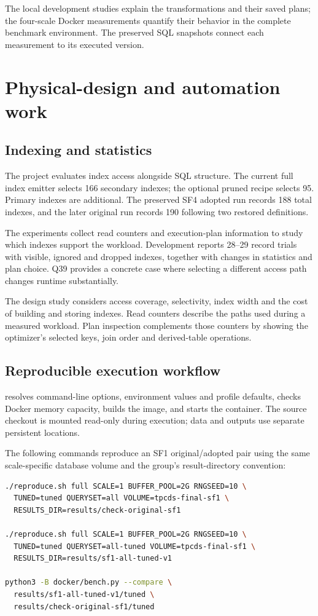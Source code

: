 \documentclass[11pt,a4paper]{article}
\DeclareRobustCommand{\file}[1]{\path{#1}}
\begin{document}
The local development studies explain the transformations and their saved
plans; the four-scale Docker measurements quantify their behavior in the
complete benchmark environment. The preserved SQL snapshots connect each
measurement to its executed version.

\section{Physical-design and automation work}
\subsection{Indexing and statistics}
The project evaluates index access alongside SQL structure. The current full
index emitter selects 166 secondary indexes; the optional pruned recipe
selects 95. Primary indexes are additional. The preserved SF4 adopted run
records 188 total indexes, and the later original run records 190 following
two restored definitions.

The experiments collect read counters and execution-plan information to study
which indexes support the workload. Development reports 28--29 record trials
with visible, ignored and dropped indexes, together with changes in statistics
and plan choice. Q39 provides a concrete case where selecting a different
access path changes runtime substantially.

The design study considers access coverage, selectivity, index width and the
cost of building and storing indexes. Read counters describe the paths used
during a measured workload. Plan inspection complements those counters by
showing the optimizer's selected keys, join order and derived-table operations.

\subsection{Reproducible execution workflow}
\file{reproduce.sh} resolves command-line options, environment values and
profile defaults, checks Docker memory capacity, builds the image, and starts
the container. The source checkout is mounted read-only during execution;
data and outputs use separate persistent locations.

The following commands reproduce an SF1 original/adopted pair using the same
scale-specific database volume and the group's result-directory convention:
\begin{lstlisting}[language=bash]
./reproduce.sh full SCALE=1 BUFFER_POOL=2G RNGSEED=10 \
  TUNED=tuned QUERYSET=all VOLUME=tpcds-final-sf1 \
  RESULTS_DIR=results/check-original-sf1

./reproduce.sh full SCALE=1 BUFFER_POOL=2G RNGSEED=10 \
  TUNED=tuned QUERYSET=all-tuned VOLUME=tpcds-final-sf1 \
  RESULTS_DIR=results/sf1-all-tuned-v1

python3 -B docker/bench.py --compare \
  results/sf1-all-tuned-v1/tuned \
  results/check-original-sf1/tuned
\end{lstlisting}
\end{document}
